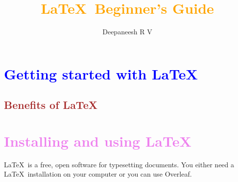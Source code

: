 \documentclass[a4paper,12pt]{article}
\title{\textcolor{orange}{\LaTeX\ Beginner's Guide}}
\author{Deepaneesh R V}
\date{}
\begin{document}
	\maketitle
	
	\section{\textcolor{blue}{Getting started with \LaTeX}}
	\blindtext[4]
	
	\newpage
	\begin{landscape}
		\section{\textcolor{brown}{Benefits of \LaTeX}}
		\blindtext[4]
	\end{landscape}
	
	\newpage
	\section{\textcolor{violet}{Installing and using \LaTeX}}
	\LaTeX\ is a free, open software for typesetting documents. You either need a \LaTeX\ installation on
	your computer or you can use Overleaf.
	\begin{multicols}{2}
		
		\blindtext[4]
	\end{multicols}
	
\end{document}
